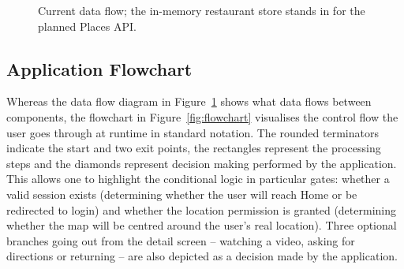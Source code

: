 \documentclass[12pt, a4paper]{article}
\begin{document}
\begin{figure}[H]
\centering
{}
\caption[Current data flow diagram.]{Current data flow; the in-memory restaurant store stands in for the planned Places API.}
\label{fig:dfd}
\end{figure}

\subsection{Application Flowchart}

Whereas the data flow diagram in Figure~\ref{fig:dfd} shows what data flows between components, the flowchart in Figure~\ref{fig:flowchart} visualises the control flow the user goes through at runtime in standard notation. The rounded terminators indicate the start and two exit points, the rectangles represent the processing steps and the diamonds represent decision making performed by the application. This allows one to highlight the conditional logic in particular gates: whether a valid session exists (determining whether the user will reach Home or be redirected to login) and whether the location permission is granted (determining whether the map will be centred around the user's real location). Three optional branches going out from the detail screen -- watching a video, asking for directions or returning -- are also depicted as a decision made by the application.
\end{document}
